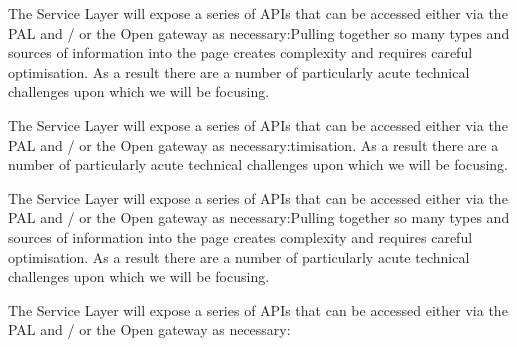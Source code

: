 \documentclass[12pt, a4paper, parskip=half,
               enlargefirstpage, pagenumber=no]{scrlttr2}
\begin{document}
The Service Layer will expose a series of APIs that can be accessed either via the PAL and / or the Open gateway as necessary:Pulling together so many types and sources of information into the page creates complexity and requires careful optimisation. As a result there are a number of particularly acute technical challenges upon which we will be focusing.

The Service Layer will expose a series of APIs that can be accessed either via the PAL and / or the Open gateway as necessary:timisation. As a result there are a number of particularly acute technical challenges upon which we will be focusing.

The Service Layer will expose a series of APIs that can be accessed either via the PAL and / or the Open gateway as necessary:Pulling together so many types and sources of information into the page creates complexity and requires careful optimisation. As a result there are a number of particularly acute technical challenges upon which we will be focusing.

The Service Layer will expose a series of APIs that can be accessed either via the PAL and / or the Open gateway as necessary:
\end{document}
